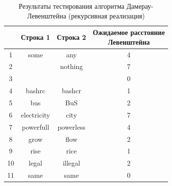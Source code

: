 \begin{table}[H]
    \caption{Результаты тестирования алгоритма Дамерау-Левенштейна (рекурсивная реализация)}
	\begin{tabular}{|c|c|c|c|}
 	\hline
    \No{} & Строка 1 & Строка 2 & \makecell{Ожидаемое расстояние\\Левенштейна}\\
 	\hline
 	1 & some & any & 4\\
 	\hline
 	2 & & nothing & 7\\
 	\hline
 	3 & & & 0\\
 	\hline
 	4 & bashrc & bashcr & 1\\
 	\hline
 	5 & bus & BuS & 2\\
 	\hline
 	6 & electricity & city & 7\\
 	\hline
 	7 & powerfull & powerless & 4\\
 	\hline
 	8 & grow & flow & 2\\
 	\hline
 	9 & rise & rice & 1\\
 	\hline
    10 & legal & illegal & 2\\
 	\hline
    11 & same & same & 0\\
    \hline
	\end{tabular}
\end{table}


